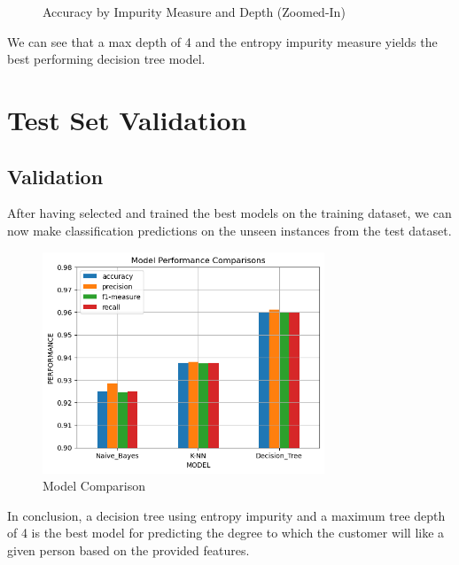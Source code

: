 \documentclass{article}
\begin{document}
\begin{figure}[H]
\begin{minipage}[t]{0.49\textwidth}
            \caption{\small{Accuracy by Impurity Measure and Depth (Zoomed-In)}}
        \end{minipage}
    \end{figure}

    We can see that a max depth of 4 and the entropy impurity measure yields the best
    performing decision tree model. 

    \newpage

\section*{Test Set Validation}

    \subsection*{Validation}

    After having selected and trained the best models on the training dataset, we can now
    make classification predictions on the unseen instances from the test dataset.

    \begin{figure}[H]
        \centering
        \includegraphics[width=0.75\textwidth, height=0.4\textheight]{comparison.png}
        \caption{\small{Model Comparison}}
    \end{figure}

    In conclusion, a decision tree using entropy impurity and a maximum tree depth of 4
    is the best model for predicting the degree to which the customer will like a given
    person based on the provided features.
\end{document}
